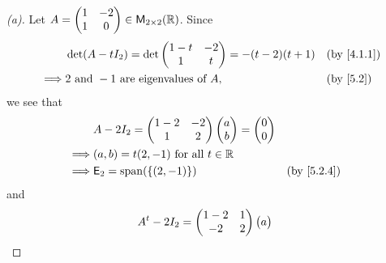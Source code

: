 \begin{proof}[(a)]
  Let \(A = \begin{pmatrix}
    1 & -2 \\
    1 & 0
  \end{pmatrix} \in \ms[2][2][\R]\).
  Since
  \begin{align*}
             & \det(A - t I_2) = \det\begin{pmatrix}
                                       1 - t & -2 \\
                                       1     & t
                                     \end{pmatrix} = -(t - 2)(t + 1)            &  & \by{4.1.1} \\
    \implies & 2 \text{ and } -1 \text{ are eigenvalues of } A, &  & \by{5.2}
  \end{align*}
  we see that
  \begin{align*}
             & A - 2I_2 = \begin{pmatrix}
                            1 - 2 & -2 \\
                            1     & 2
                          \end{pmatrix} \begin{pmatrix}
                                          a \\
                                          b
                                        \end{pmatrix} = \begin{pmatrix}
                                                          0 \\
                                                          0
                                                        \end{pmatrix}     \\
    \implies & (a, b) = t(2, -1) \text{ for all } t \in \R                 \\
    \implies & \vs{E}_2 = \spn{\set{(2, -1)}}              &  & \by{5.2.4}
  \end{align*}
  and
  \begin{align*}
             & {A}^{t} - 2I_2 = \begin{pmatrix}
                                 1 - 2 & 1 \\
                                 -2    & 2
                               \end{pmatrix} \begin{pmatrix}
                                               a \\

\end{pmatrix}
\end{align*}
\end{proof}

